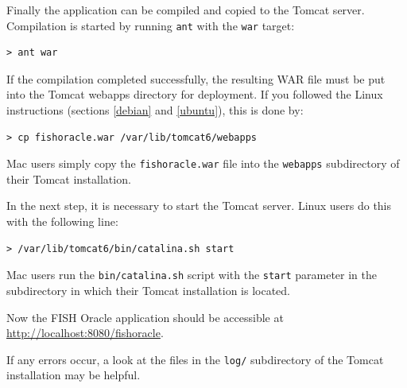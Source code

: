 \documentclass[11pt,final]{article}
\newcommand{\Gt}[0]{\emph{GenomeTools}\xspace}
\newcommand{\Gtj}[0]{\emph{GenomeTools-Java}\xspace}
\begin{document}
Finally the application can be compiled and copied to the Tomcat server.
Compilation is started by running \texttt{ant} with the \texttt{war} target:

\begin{lstlisting}
> ant war
\end{lstlisting}

If the compilation completed successfully, the resulting WAR file must be
put into the Tomcat webapps directory for deployment.
If you followed the Linux instructions (sections \ref{debian} and \ref{ubuntu}),
this is done by:

\begin{lstlisting}
> cp fishoracle.war /var/lib/tomcat6/webapps
\end{lstlisting}

Mac users simply copy the \texttt{fishoracle.war} file into the \texttt{webapps}
subdirectory of their Tomcat installation.

In the next step, it is necessary to start the Tomcat server. Linux users do
this with the following line:

\begin{lstlisting}
> /var/lib/tomcat6/bin/catalina.sh start
\end{lstlisting}

Mac users run the \texttt{bin/catalina.sh} script with the \texttt{start}
parameter in the subdirectory in which their Tomcat installation is located.

Now the FISH Oracle application should be accessible at
\url{http://localhost:8080/fishoracle}.

If any errors occur, a look at the files in the \texttt{log/} subdirectory of
the Tomcat installation may be helpful.




\end{document}
